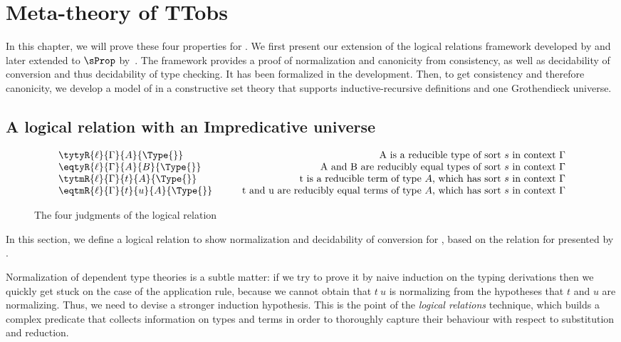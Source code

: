 \setchapterpreamble[u]{\margintoc}
\chapter{Meta-theory of TTobs}

In this chapter, we will prove these four properties for \SetoidCC.
%
We first present our extension of the
logical relations framework developed by  and
later extended to $\sProp$ by~. The
framework provides a proof of normalization and canonicity from
consistency, as well as decidability of conversion and thus decidability of
type checking.
%
It has been formalized in the \Agda development.
%
Then, to get consistency and therefore canonicity, we develop a model of
\SetoidCC in a constructive set theory that supports inductive-recursive definitions and one
Grothendieck universe.


\section{A logical relation with an Impredicative universe}
\label{sec:logic-relat-with}

\begin{figure*}
    \[
  \begin{array}{lr}
    \tytyR{\ell}{\Gamma}{A}{\Type{}} & \text{A is a reducible type of sort \( s \) in context \( \Gamma \)} \\
    \eqtyR{\ell}{\Gamma}{A}{B}{\Type{}} & \text{A and B are reducibly equal types of sort \( s \) in context \( \Gamma \)} \\
    \tytmR{\ell}{\Gamma}{t}{A}{\Type{}} & \text{t is a reducible term of type \( A \), which has sort \( s \) in context \( \Gamma \)} \\
    \eqtmR{\ell}{\Gamma}{t}{u}{A}{\Type{}} & \qquad\text{t and u are reducibly equal terms of type \( A \), which has sort \( s \) in context \( \Gamma \)}
  \end{array}
\]
  \caption{The four judgments of the logical relation}
  \label{fig:log-rel-judgments}
\end{figure*}

In this section, we define a logical relation to show
normalization and decidability of conversion for \SetoidCC, 
based on the relation for \MLTT presented by .

Normalization of dependent type theories is a subtle matter:
if we try to prove it by naive induction on the typing derivations
then we quickly get stuck on the case of the application rule, because
we cannot obtain that \( t~u \) is normalizing from the hypotheses that
$t$ and $u$ are normalizing.
%
Thus, we need to devise a stronger induction hypothesis.
% 
This is the point of the \emph{logical relations} technique, which builds
a complex predicate that collects information on types and terms in order 
to thoroughly capture their behaviour with respect to substitution and reduction.

